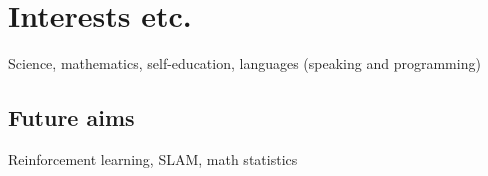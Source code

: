 \documentclass[letterpaper]{twentysecondcv} %
\begin{document}
\section{Interests etc.}

Science, mathematics, self-education, languages (speaking and programming)

\subsection{Future aims}

Reinforcement learning, SLAM, math statistics









\end{document}
